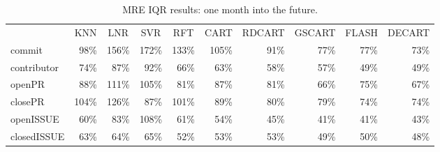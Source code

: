 \documentclass[smallextended]{svjour3}
\begin{document}
\begin{table}[!t]
\centering
\caption{
MRE IQR results: one month into the future. }
\label{tbl:iqr_mre}
\begin{adjustbox}{max width=0.96\textwidth}     
\begin{tabular}{lrrrrrrrrr}
            & \multicolumn{1}{c}{KNN}       & \multicolumn{1}{c}{LNR}       & \multicolumn{1}{c}{SVR}       & \multicolumn{1}{c}{RFT}       & \multicolumn{1}{c}{CART}      & \multicolumn{1}{c}{RDCART}   & \multicolumn{1}{c}{GSCART}   & \multicolumn{1}{c}{FLASH}    & \multicolumn{1}{c}{DECART}   \\
commit      & \cellcolor[HTML]{F4F4F4}98\%  & \cellcolor[HTML]{FCFCFC}156\% & \cellcolor[HTML]{FFFFFF}172\% & \cellcolor[HTML]{F9F9F9}133\% & \cellcolor[HTML]{F5F5F5}105\% & \cellcolor[HTML]{F3F3F3}91\% & \cellcolor[HTML]{F1F1F1}77\% & \cellcolor[HTML]{F1F1F1}77\% & \cellcolor[HTML]{F0F0F0}73\% \\
contributor & \cellcolor[HTML]{F0F0F0}74\%  & \cellcolor[HTML]{F2F2F2}87\%  & \cellcolor[HTML]{F3F3F3}92\%  & \cellcolor[HTML]{EFEFEF}66\%  & \cellcolor[HTML]{EFEFEF}63\%  & \cellcolor[HTML]{DBDBDB}58\% & \cellcolor[HTML]{D4D4D4}57\% & \cellcolor[HTML]{9D9D9D}49\% & \cellcolor[HTML]{9D9D9D}49\% \\
openPR      & \cellcolor[HTML]{F2F2F2}88\%  & \cellcolor[HTML]{F6F6F6}111\% & \cellcolor[HTML]{F5F5F5}105\% & \cellcolor[HTML]{F1F1F1}81\%  & \cellcolor[HTML]{F2F2F2}87\%  & \cellcolor[HTML]{F1F1F1}81\% & \cellcolor[HTML]{EFEFEF}66\% & \cellcolor[HTML]{F1F1F1}75\% & \cellcolor[HTML]{EFEFEF}67\% \\
closePR     & \cellcolor[HTML]{F5F5F5}104\% & \cellcolor[HTML]{F8F8F8}126\% & \cellcolor[HTML]{F2F2F2}87\%  & \cellcolor[HTML]{F4F4F4}101\% & \cellcolor[HTML]{F3F3F3}89\%  & \cellcolor[HTML]{F1F1F1}80\% & \cellcolor[HTML]{F1F1F1}79\% & \cellcolor[HTML]{F0F0F0}74\% & \cellcolor[HTML]{F0F0F0}74\% \\
openISSUE   & \cellcolor[HTML]{E8E8E8}60\%  & \cellcolor[HTML]{F2F2F2}83\%  & \cellcolor[HTML]{F5F5F5}108\% & \cellcolor[HTML]{EFEFEF}61\%  & \cellcolor[HTML]{BFBFBF}54\%  & \cellcolor[HTML]{818181}45\% & \cellcolor[HTML]{666666}41\% & \cellcolor[HTML]{666666}41\% & \cellcolor[HTML]{737373}43\% \\
closedISSUE & \cellcolor[HTML]{EFEFEF}63\%  & \cellcolor[HTML]{EFEFEF}64\%  & \cellcolor[HTML]{EFEFEF}65\%  & \cellcolor[HTML]{B1B1B1}52\%  & \cellcolor[HTML]{B8B8B8}53\%  & \cellcolor[HTML]{B8B8B8}53\% & \cellcolor[HTML]{9D9D9D}49\% & \cellcolor[HTML]{A3A3A3}50\% & \cellcolor[HTML]{969696}48\%
\end{tabular}
\end{adjustbox}   
\end{table}
\end{document}
